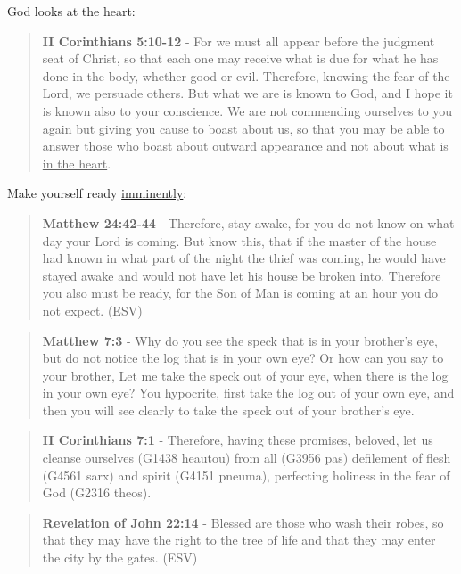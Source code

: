 \documentclass[11pt]{article}
\begin{document}
God looks at the heart:

\begin{quote}
\textbf{II Corinthians 5:10-12} - For we must all appear before the judgment seat of Christ, so that each one may receive what is due for what he has done in the body, whether good or evil. Therefore, knowing the fear of the Lord, we persuade others. But what we are is known to God, and I hope it is known also to your conscience. We are not commending ourselves to you again but giving you cause to boast about us, so that you may be able to answer those who boast about outward appearance and not about \uline{what is in the heart}.
\end{quote}

Make yourself ready \uline{imminently}:

\begin{quote}
\textbf{Matthew 24:42-44} - Therefore, stay awake, for you do not know on what day your Lord is coming. But know this, that if the master of the house had known in what part of the night the thief was coming, he would have stayed awake and would not have let his house be broken into. Therefore you also must be ready, for the Son of Man is coming at an hour you do not expect. (ESV)
\end{quote}

\begin{quote}
\textbf{Matthew 7:3} - Why do you see the speck that is in your brother's eye, but do not notice the log that is in your own eye?  Or how can you say to your brother, Let me take the speck out of your eye, when there is the log in your own eye?  You hypocrite, first take the log out of your own eye, and then you will see clearly to take the speck out of your brother's eye.
\end{quote}

\begin{quote}
\textbf{II Corinthians 7:1} - Therefore, having these promises, beloved, let us cleanse ourselves (G1438 heautou) from all (G3956 pas) defilement of flesh (G4561 sarx) and spirit (G4151 pneuma), perfecting holiness in the fear of God (G2316 theos).
\end{quote}

\begin{quote}
\textbf{Revelation of John 22:14} - Blessed are those who wash their robes, so that they may have the right to the tree of life and that they may enter the city by the gates. (ESV)
\end{quote}
\end{document}
